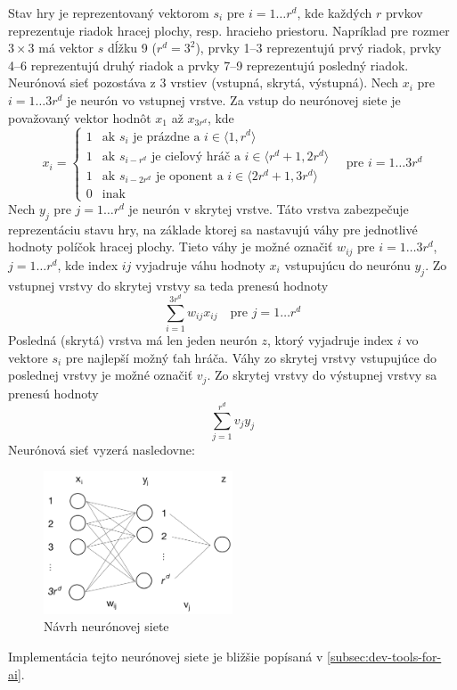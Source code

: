 Stav hry je reprezentovaný vektorom $s_i$ pre $i=1 \dots r^d$, kde každých $r$ prvkov reprezentuje riadok hracej plochy,
resp. hracieho priestoru.
Napríklad pre rozmer $3 \times 3$ má vektor $s$ dĺžku 9 ($r^d=3^2$), prvky 1--3 reprezentujú prvý riadok, prvky
4--6 reprezentujú druhý riadok a prvky 7--9 reprezentujú posledný riadok.
Neurónová sieť pozostáva z 3 vrstiev (vstupná, skrytá, výstupná).
Nech $x_i$ pre $i=1 \dots 3r^d$ je neurón vo vstupnej vrstve.
Za vstup do neurónovej siete je považovaný vektor hodnôt $x_1$ až $x_{3r^d}$, kde
\begin{equation}
    x_i=
    \begin{cases}
        1 & \text{ak }s_i\text{ je prázdne a } i \in \langle 1, r^d \rangle \\
        1 & \text{ak }s_{i-r^d}\text{ je cieľový hráč a } i \in \langle r^d+1, 2r^d \rangle \\
        1 & \text{ak }s_{i-2r^d}\text{ je oponent a } i \in \langle 2r^d+1, 3r^d \rangle \\
        0 & \text{inak}
    \end{cases}
    \quad
    \text{pre }i=1 \dots 3r^d
\end{equation}
Nech $y_j$ pre $j=1 \dots r^d$ je neurón v skrytej vrstve.
Táto vrstva zabezpečuje reprezentáciu stavu hry, na základe ktorej sa nastavujú váhy pre jednotlivé hodnoty políčok
hracej plochy.
Tieto váhy je možné označiť $w_{ij}$ pre $i=1 \dots 3r^d$, $j=1 \dots r^d$, kde index $ij$ vyjadruje váhu hodnoty
$x_i$ vstupujúcu do neurónu $y_j$.
Zo vstupnej vrstvy do skrytej vrstvy sa teda prenesú hodnoty
\begin{equation}
    \sum_{i=1}^{3r^d} w_{ij}x_{ij} \quad \text{pre } j=1 \dots r^d
\end{equation}
Posledná (skrytá) vrstva má len jeden neurón $z$, ktorý vyjadruje index $i$ vo vektore $s_i$ pre najlepší možný ťah
hráča.
Váhy zo skrytej vrstvy vstupujúce do poslednej vrstvy je možné označiť $v_j$.
Zo skrytej vrstvy do výstupnej vrstvy sa prenesú hodnoty
\begin{equation}
    \sum_{j=1}^{r^d} v_{j}y_{j}
\end{equation}
Neurónová sieť vyzerá nasledovne:

\begin{figure}[H]
    \centering
    \includegraphics[width=0.5\textwidth]{images/ann.jpg}
    \caption{Návrh neurónovej siete}
\end{figure}
Implementácia tejto neurónovej siete je bližšie popísaná v \autoref{subsec:dev-tools-for-ai}.

